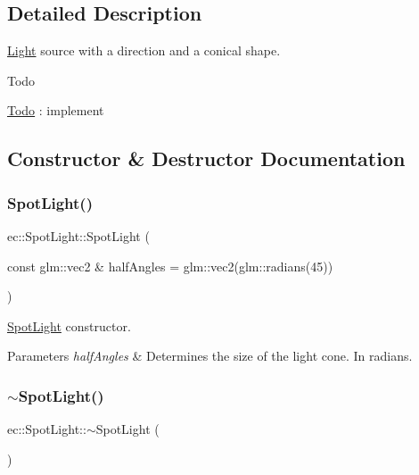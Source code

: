 \subsection{Detailed Description}
\mbox{\hyperlink{classec_1_1_light}{Light}} source with a direction and a conical shape. 

\begin{DoxyRefDesc}{Todo}
\item[\mbox{\hyperlink{todo__todo000005}{Todo}}]\+: implement \end{DoxyRefDesc}


\subsection{Constructor \& Destructor Documentation}
\mbox{\label{classec_1_1_spot_light_a52800f7bbfacd2e5a4ef2f3f6696cb46}} 
\subsubsection{\texorpdfstring{Spot\+Light()}{SpotLight()}}
{\footnotesize\ttfamily ec\+::\+Spot\+Light\+::\+Spot\+Light (\begin{DoxyParamCaption}\item[{const glm\+::vec2 \&}]{half\+Angles = {\ttfamily glm\+:\+:vec2(glm\+:\+:radians(45))} }\end{DoxyParamCaption})\hspace{0.3cm}{\ttfamily [explicit]}}



\mbox{\hyperlink{classec_1_1_spot_light}{Spot\+Light}} constructor. 


\begin{DoxyParams}{Parameters}
{\em half\+Angles} & Determines the size of the light cone. In radians. \\
\hline
\end{DoxyParams}
\mbox{\label{classec_1_1_spot_light_adc9a1ffa198252e085c6862c063c8263}} 
\subsubsection{\texorpdfstring{$\sim$\+Spot\+Light()}{~SpotLight()}}
{\footnotesize\ttfamily ec\+::\+Spot\+Light\+::$\sim$\+Spot\+Light (\begin{DoxyParamCaption}{ }\end{DoxyParamCaption})\hspace{0.3cm}{\ttfamily [default]}}



